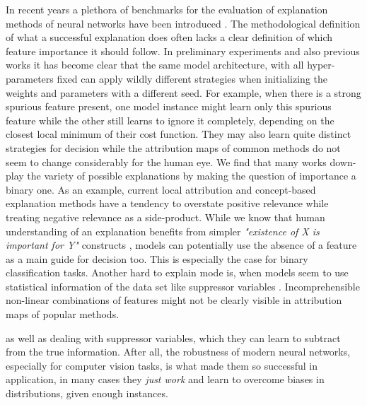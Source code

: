 {In recent years a plethora of benchmarks for the evaluation of explanation methods of neural networks have been introduced .
The methodological definition of what a successful explanation does often lacks a clear definition of which feature importance it should follow. 
In preliminary experiments and also previous works it has become clear that the same model architecture, with all hyper-parameters fixed can apply wildly different strategies when initializing the weights and parameters with a different seed. For example, when there is a strong spurious feature present, one model instance might learn only this spurious feature while the other still learns to ignore it completely, depending on the closest local minimum of their cost function. They may also learn quite distinct strategies for decision while the attribution maps of common methods do not seem to change considerably for the human eye. We find that many works down-play the variety of possible explanations by making the question of importance a binary one. 
As an example, current local attribution and concept-based explanation methods have a tendency to overstate positive relevance while treating negative relevance as a side-product. While we know that human understanding of an explanation benefits from simpler \textit{"existence of X is important for Y"} constructs , models can potentially use the absence of a feature as a main guide for decision too. This is especially the case for binary classification tasks.
Another hard to explain mode is, when models seem to use statistical information of the data set like suppressor variables . Incomprehensible non-linear combinations of features might not be clearly visible in attribution maps of popular methods.

as well as dealing with suppressor variables, which they can learn to subtract from the true information. After all, the robustness of modern neural networks, especially for computer vision tasks, is what made them so successful in application, in many cases they \textit{just work} and learn to overcome biases in distributions, given enough instances. 


}
